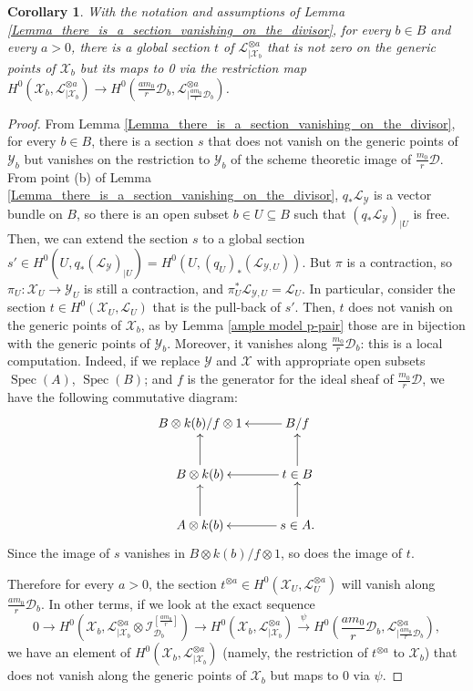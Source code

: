 \documentclass{amsart}
\newcommand{\cD}{\mathcal{D}}
\newcommand{\cI}{\mathcal{I}}
\newcommand{\cL}{\mathcal{L}}
\newcommand{\cX}{\mathcal{X}}
\newcommand{\cY}{\mathcal{Y}}
\newcommand{\spec}{\operatorname{Spec}}
\newtheorem{Cor}[theorem]{Corollary}
\theoremstyle{definition}
\begin{document}
\begin{Cor}\label{corollary_the_section_that_vanishes_on_the_scheme_theoretic_image_of_m0/rD_can_be_lifted_on_X}
With the notation and assumptions of Lemma \ref{Lemma_there_is_a_section_vanishing_on_the_divisor}, for every $b\in B$ and every $a>0$, there is a global section $t$ of $\cL_{|\cX_b}^{\otimes a}$ that is not zero on the generic points of $\cX_b$ but its maps to 0 via the restriction map $H^0(\cX_b, \cL_{|\cX_b}^{\otimes a})\to H^0(\frac{am_0}{r}\cD_b, \cL^{\otimes a}_{|\frac{am_0}{r}\cD_b})$.
\end{Cor}

\begin{proof}
From Lemma \ref{Lemma_there_is_a_section_vanishing_on_the_divisor}, for every $b \in B$, there is a section $s$ that does not vanish on the generic points of $\cY_b$ but vanishes on the restriction to $\cY_b$ of the scheme theoretic image of $\frac{m_0}{r}\cD$.
From point (b) of  Lemma \ref{Lemma_there_is_a_section_vanishing_on_the_divisor}, $q_*\cL_\cY$ is a vector bundle on $B$, so there is an open subset $b\in U\subseteq B$ such that $(q_*\cL_\cY)_{|U}$ is free.
Then, we can extend the section $s$ to a global section $s'\in H^0(U,q_*(\cL_\cY)_{|U}) = H^0(U,(q_U)_*(\cL_{\cY,U}))$.
But $\pi$ is a contraction, so $\pi_{U} \colon \cX_U\to \cY_U$ is still a contraction, and $\pi_{U}^*\cL_{\cY,U} = \cL_U$.
In particular, consider the section $t\in H^0(\cX_U,\cL_U)$ that is the pull-back of $s'$.
Then, $t$ does not vanish on the generic points of $\cX_b$, as by Lemma \ref{ample model p-pair} those are in bijection with the generic points of $\cY_b$.
Moreover, it vanishes along $\frac{m_0}{r}\cD_b$: this is a local computation. Indeed, if we replace $\cY$ and $\cX$ with appropriate open subsets $\spec(A)$, $\spec(B)$; and $f$ is the generator for the ideal sheaf of $\frac{m_0}{r}\cD$, we have the following commutative diagram:
$$\xymatrix{B\otimes k(b)/f\otimes 1 & B/f \ar[l] \\ B\otimes k(b) \ar[u] & t\in B  \ar[u] \ar[l] \\ A\otimes k(b) \ar[u] & s\in A. \ar[u] \ar[l]}$$
Since the image of $s$ vanishes in $B\otimes k(b)/f\otimes 1 $, so does the image of $t$. 

Therefore for every $a>0$, the section $t^{\otimes a}\in H^0(\cX_U,\cL_U^{\otimes a})$ will vanish along $\frac{am_0}{r}\cD_b$.
In other terms, if we look at the exact sequence
\[
0 \to H^0(\cX_b, \cL_{|\cX_b}^{\otimes a}\otimes \cI_{\cD_b}^{[\frac{am_0}{r}]})\to H^0(\cX_b, \cL_{|\cX_b}^{\otimes a})\xrightarrow{\psi} H^0(\frac{am_0}{r}\cD_b, \cL^{\otimes a}_{|\frac{am_0}{r}\cD_b}),
\]
we have an element of $H^0(\cX_b, \cL_{|\cX_b}^{\otimes a})$ (namely, the restriction of $t^{\otimes a}$ to $\cX_b$) that does not vanish along the generic points of $\cX_b$ but maps to 0 via $\psi$.
\end{proof}
\end{document}
